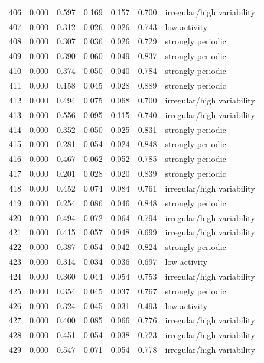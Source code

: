 \begin{longtable}{lrrrrrl}
406 & 0.000 & 0.597 & 0.169 & 0.157 & 0.700 & irregular/high variability \\
407 & 0.000 & 0.312 & 0.026 & 0.026 & 0.743 & low activity \\
408 & 0.000 & 0.307 & 0.036 & 0.026 & 0.729 & strongly periodic \\
409 & 0.000 & 0.390 & 0.060 & 0.049 & 0.837 & strongly periodic \\
410 & 0.000 & 0.374 & 0.050 & 0.040 & 0.784 & strongly periodic \\
411 & 0.000 & 0.158 & 0.045 & 0.028 & 0.889 & strongly periodic \\
412 & 0.000 & 0.494 & 0.075 & 0.068 & 0.700 & irregular/high variability \\
413 & 0.000 & 0.556 & 0.095 & 0.115 & 0.740 & irregular/high variability \\
414 & 0.000 & 0.352 & 0.050 & 0.025 & 0.831 & strongly periodic \\
415 & 0.000 & 0.281 & 0.054 & 0.024 & 0.848 & strongly periodic \\
416 & 0.000 & 0.467 & 0.062 & 0.052 & 0.785 & strongly periodic \\
417 & 0.000 & 0.201 & 0.028 & 0.020 & 0.839 & strongly periodic \\
418 & 0.000 & 0.452 & 0.074 & 0.084 & 0.761 & irregular/high variability \\
419 & 0.000 & 0.254 & 0.086 & 0.046 & 0.848 & strongly periodic \\
420 & 0.000 & 0.494 & 0.072 & 0.064 & 0.794 & irregular/high variability \\
421 & 0.000 & 0.415 & 0.057 & 0.048 & 0.699 & irregular/high variability \\
422 & 0.000 & 0.387 & 0.054 & 0.042 & 0.824 & strongly periodic \\
423 & 0.000 & 0.314 & 0.034 & 0.036 & 0.697 & low activity \\
424 & 0.000 & 0.360 & 0.044 & 0.054 & 0.753 & irregular/high variability \\
425 & 0.000 & 0.354 & 0.045 & 0.037 & 0.767 & strongly periodic \\
426 & 0.000 & 0.324 & 0.045 & 0.031 & 0.493 & low activity \\
427 & 0.000 & 0.400 & 0.085 & 0.066 & 0.776 & irregular/high variability \\
428 & 0.000 & 0.451 & 0.054 & 0.038 & 0.723 & irregular/high variability \\
429 & 0.000 & 0.547 & 0.071 & 0.054 & 0.778 & irregular/high variability \\

\end{longtable}
